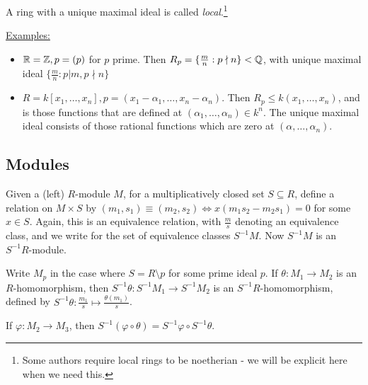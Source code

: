\documentclass[10pt,a4paper]{article}
\begin{document}
\begin{definition}
  A ring with a unique maximal ideal is called \emph{local}.\footnote{Some authors require local rings to be noetherian - we will be explicit here when we need this.}
\end{definition}
\underline{Examples:}
\begin{itemize}
  \item $\mathbb{R}=\mathbb{Z}, p = (p)$ for $p$ prime. Then $R_p = \{\frac{m}{n}:p\nmid n\}<\mathbb{Q}$, with unique maximal ideal $\{\frac{m}{n}:p|m, p\nmid n\}$

  \item $R = k[x_1, \ldots, x_n], p = (x_1-\alpha_1, \ldots, x_n-\alpha_n)$. Then $R_p \leq k(x_1, \ldots, x_n)$, and is those functions that are defined at $(\alpha_1, \ldots, \alpha_n)\in k^n$. The unique maximal ideal consists of those rational functions which are zero at $(\alpha, \ldots, \alpha_n)$.
\end{itemize}

\subsection{Modules}
Given a (left) $R$-module $M$, for a multiplicatively closed set $S \subseteq R$, define a relation on $M \times S$ by $(m_1, s_1) \equiv (m_2, s_2) \iff x(m_1s_2-m_2s_1) = 0$ for some $x \in S$. Again, this is an equivalence relation, with $\frac{m}{s}$ denoting an equivalence class, and we write for the set of equivalence classes $S^{-1}M$. Now $S^{-1}M$ is an $S^{-1}R$-module.

Write $M_p$ in the case where $S = R\setminus p$ for some prime ideal $p$. If $\theta:M_1 \to M_2$ is an $R$-homomorphism, then $S^{-1}\theta: S^{-1}M_1 \to S^{-1}M_2$ is an $S^{-1}R$-homomorphism, defined by $S^{-1}\theta:\frac{m_1}{s}\mapsto\frac{\theta(m_1)}{s}$.

If $\varphi:M_2 \to M_3$, then $S^{-1}(\varphi\circ\theta) = S^{-1}\varphi \circ S^{-1}\theta$.
\end{document}
